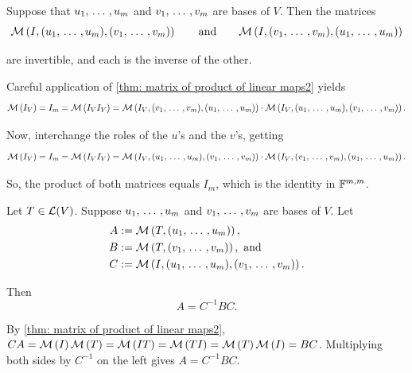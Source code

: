   \begin{thm} 
    \label{thm: matrix of identity operator with respect to two bases}
    Suppose that $u_1, {\, \ldots \,\,}, u_m$ and $v_1, {\, \ldots \,\,}, v_m$ are bases of $V$. Then the matrices
    \begin{equation}
      \mathcal{M} \left(I, (u_1, {\, \ldots \,\,}, u_m), (v_1, {\, \ldots \,\,}, v_m)\right) \qquad \text{and} \qquad \mathcal{M} \left(I, (v_1, {\, \ldots \,\,}, v_m), (u_1, {\, \ldots \,\,},u_m)\right)
    \end{equation}

    are invertible, and each is the inverse of the other.
  \end{thm}
  \begin{prf}
    Careful application of \ref{thm: matrix of product of linear maps2} yields
    \begin{equation}
      \mathcal{M} \left(I_V\right) = I_m = \mathcal{M} \left(I_V I_V\right) = \mathcal{M} \left(I_V, (v_1, {\, \ldots \,\,}, v_m), (u_1, {\, \ldots \,\,}, u_m)\right) \cdot \mathcal{M} \left(I_V, (u_1, {\, \ldots \,\,}, u_m), (v_1, {\, \ldots \,\,}, v_m)\right).
    \end{equation}

    Now, interchange the roles of the $u$'s and the $v$'s, getting
    \begin{equation}
      \mathcal{M} \left(I_V\right) = I_m = \mathcal{M} \left(I_V I_V\right) = \mathcal{M} \left(I_V, (u_1, {\, \ldots \,\,}, u_m), (v_1, {\, \ldots \,\,}, v_m)\right) \cdot \mathcal{M} \left(I_V, (v_1, {\, \ldots \,\,}, v_m), (u_1, {\, \ldots \,\,}, u_m)\right).
    \end{equation}

    So, the product of both matrices equals $I_m$, which is the identity in $\mathbb{F}^{m,m}$.
  \end{prf}

  \setcounter{thm}{83}
  \begin{thm}
    Let $T \in \mathcal{L}(V)$. Suppose $u_1, {\, \ldots \,\,}, u_m$ and $v_1, {\, \ldots \,\,}, v_m$ are bases of $V$. Let
    \begin{equation}
      \begin{aligned}
        A & := \mathcal{M} \left(T, (u_1, {\, \ldots \,\,}, u_m)\right), \\
        B & := \mathcal{M} \left(T, (v_1, {\, \ldots \,\,}, v_m)\right), \text{ and }\\
        C & := \mathcal{M} \left(I, (u_1, {\, \ldots \,\,}, u_m), (v_1, {\, \ldots \,\,}, v_m)\right). \\
      \end{aligned}
    \end{equation}

    Then
    \begin{equation}
      A = C^{-1} B C.
    \end{equation}
  \end{thm}
  \begin{prf}
    By \ref{thm: matrix of product of linear maps2}, $CA = \mathcal{M} \left(I\right) \mathcal{M} \left(T\right) = \mathcal{M} \left(IT\right) = \mathcal{M} \left(TI\right) = \mathcal{M} \left(T\right)\mathcal{M} \left(I\right) = BC$.
    Multiplying both sides by $C^{-1}$ on the left gives $A = C^{-1} B C$.
  \end{prf}

